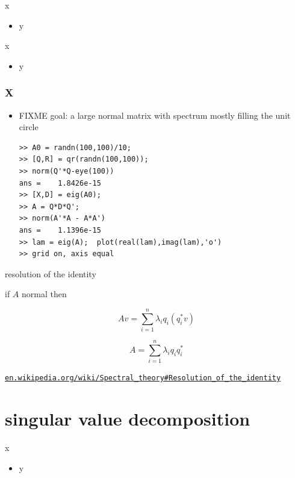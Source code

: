 \documentclass[10pt,hyperref]{beamer}
\begin{document}
\begin{frame}{x}

\begin{itemize}
\item y
\end{itemize}
\end{frame}

\begin{frame}{x}

\begin{itemize}
\item y
\end{itemize}
\end{frame}

\begin{frame}[fragile]
\frametitle{X}

\begin{itemize}
\item FIXME  goal: a large normal matrix with spectrum mostly filling the unit circle

\begin{Verbatim}[fontsize=\scriptsize]
>> A0 = randn(100,100)/10;
>> [Q,R] = qr(randn(100,100));
>> norm(Q'*Q-eye(100))
ans =    1.8426e-15
>> [X,D] = eig(A0);
>> A = Q*D*Q';
>> norm(A'*A - A*A')
ans =    1.1396e-15
>> lam = eig(A);  plot(real(lam),imag(lam),'o')
>> grid on, axis equal
\end{Verbatim}

\end{itemize}
\end{frame}


\begin{frame}{resolution of the identity}

if $A$ normal then

$$Av = \sum_{i=1}^n \lambda_i q_i (q_i^*v)$$

$$A = \sum_{i=1}^n \lambda_i q_i q_i^*$$

\footnotesize
\href{https://en.wikipedia.org/wiki/Spectral_theory\#Resolution_of_the_identity}{\texttt{en.wikipedia.org/wiki/Spectral\_theory\#Resolution\_of\_the\_identity}}
\end{frame}


\section{singular value decomposition}

\begin{frame}{x}

\begin{itemize}
\item y
\end{itemize}
\end{frame}
\end{document}
